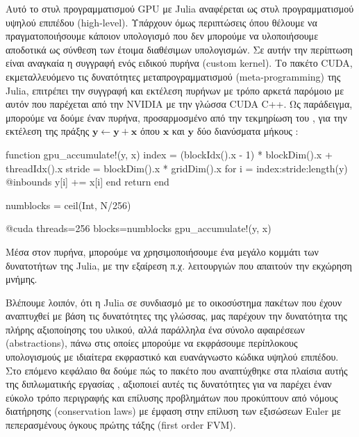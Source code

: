Αυτό το στυλ προγραμματισμού GPU με Julia αναφέρεται ως στυλ προγραμματισμού υψηλού επιπέδου (high-level).
Υπάρχουν όμως περιπτώσεις όπου θέλουμε να πραγματοποιήσουμε κάποιον υπολογισμό που δεν μπορούμε να υλοποιήσουμε αποδοτικά ως σύνθεση των έτοιμα διαθέσιμων υπολογισμών.
Σε αυτήν την περίπτωση είναι αναγκαία η συγγραφή ενός ειδικού πυρήνα (custom kernel).
Το πακέτο CUDA, εκμεταλλευόμενο τις δυνατότητες μεταπρογραμματισμού (meta-programming) της Julia, επιτρέπει την συγγραφή και εκτέλεση πυρήνων με τρόπο αρκετά παρόμοιο με αυτόν που παρέχεται από την NVIDIA με την γλώσσα CUDA C++.
Ως παράδειγμα, μπορούμε να δούμε έναν πυρήνα, προσαρμοσμένο από την τεκμηρίωση του , για την εκτέλεση της πράξης $\mathbf{y} \leftarrow \mathbf{y} + \mathbf{x}$ όπου $\mathbf{x}$ και $\mathbf{y}$ δύο διανύσματα μήκους :

{\large
\begin{jllisting}[language=julia,style=jlcodestyle]
function gpu_accumulate!(y, x)
    index = (blockIdx().x - 1) * blockDim().x + threadIdx().x
    stride = blockDim().x * gridDim().x
    for i = index:stride:length(y)
        @inbounds y[i] += x[i]
    end
    return
end

numblocks = ceil(Int, N/256)

@cuda threads=256 blocks=numblocks gpu_accumulate!(y, x)
\end{jllisting}
}

Μέσα στον πυρήνα, μπορούμε να χρησιμοποιήσουμε ένα μεγάλο κομμάτι των δυνατοτήτων της Julia, με την εξαίρεση π.χ. λειτουργιών που απαιτούν την εκχώρηση μνήμης.

Βλέπουμε λοιπόν, ότι η Julia σε συνδιασμό με το οικοσύστημα πακέτων που έχουν αναπτυχθεί με βάση τις δυνατότητες της γλώσσας, μας παρέχουν την δυνατότητα της πλήρης αξιοποίησης του υλικού, αλλά παράλληλα ένα σύνολο αφαιρέσεων (abstractions), πάνω στις οποίες μπορούμε να εκφράσουμε περίπλοκους υπολογισμούς με ιδιαίτερα εκφραστικό και ευανάγνωστο κώδικα υψηλού επιπέδου.
Στο επόμενο κεφάλαιο θα δούμε πώς το πακέτο που αναπτύχθηκε στα πλαίσια αυτής της διπλωματικής εργασίας , αξιοποιεί αυτές τις δυνατότητες για να παρέχει έναν εύκολο τρόπο περιγραφής και επίλυσης προβλημάτων που προκύπτουν από νόμους διατήρησης (conservation laws) με έμφαση στην επίλυση των εξισώσεων Euler με πεπερασμένους όγκους πρώτης τάξης (first order FVM).

